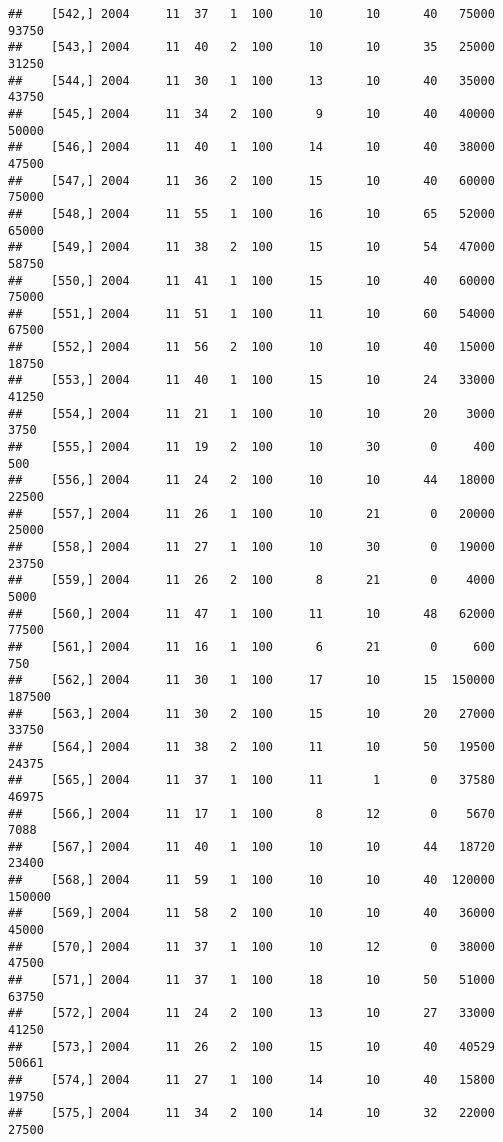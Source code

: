 \documentclass{article}\usepackage[]{graphicx}\usepackage[]{color}
\makeatletter
\newenvironment{kframe}{%
 \def\at@end@of@kframe{}%
 \ifinner\ifhmode%
  \def\at@end@of@kframe{\end{minipage}}%
  \begin{minipage}{\columnwidth}%
 \fi\fi%
 \def\FrameCommand##1{\hskip\@totalleftmargin \hskip-\fboxsep
 \colorbox{shadecolor}{##1}\hskip-\fboxsep
     \hskip-\linewidth \hskip-\@totalleftmargin \hskip\columnwidth}%
 \MakeFramed {\advance\hsize-\width
   \@totalleftmargin\z@ \linewidth\hsize
   \@setminipage}}%
 {\par\unskip\endMakeFramed%
 \at@end@of@kframe}
\newenvironment{knitrout}{}{} %
\makeatother
\begin{document}
\begin{knitrout}
\begin{kframe}
\begin{verbatim}
##    [542,] 2004     11  37   1  100     10      10      40   75000   93750
##    [543,] 2004     11  40   2  100     10      10      35   25000   31250
##    [544,] 2004     11  30   1  100     13      10      40   35000   43750
##    [545,] 2004     11  34   2  100      9      10      40   40000   50000
##    [546,] 2004     11  40   1  100     14      10      40   38000   47500
##    [547,] 2004     11  36   2  100     15      10      40   60000   75000
##    [548,] 2004     11  55   1  100     16      10      65   52000   65000
##    [549,] 2004     11  38   2  100     15      10      54   47000   58750
##    [550,] 2004     11  41   1  100     15      10      40   60000   75000
##    [551,] 2004     11  51   1  100     11      10      60   54000   67500
##    [552,] 2004     11  56   2  100     10      10      40   15000   18750
##    [553,] 2004     11  40   1  100     15      10      24   33000   41250
##    [554,] 2004     11  21   1  100     10      10      20    3000    3750
##    [555,] 2004     11  19   2  100     10      30       0     400     500
##    [556,] 2004     11  24   2  100     10      10      44   18000   22500
##    [557,] 2004     11  26   1  100     10      21       0   20000   25000
##    [558,] 2004     11  27   1  100     10      30       0   19000   23750
##    [559,] 2004     11  26   2  100      8      21       0    4000    5000
##    [560,] 2004     11  47   1  100     11      10      48   62000   77500
##    [561,] 2004     11  16   1  100      6      21       0     600     750
##    [562,] 2004     11  30   1  100     17      10      15  150000  187500
##    [563,] 2004     11  30   2  100     15      10      20   27000   33750
##    [564,] 2004     11  38   2  100     11      10      50   19500   24375
##    [565,] 2004     11  37   1  100     11       1       0   37580   46975
##    [566,] 2004     11  17   1  100      8      12       0    5670    7088
##    [567,] 2004     11  40   1  100     10      10      44   18720   23400
##    [568,] 2004     11  59   1  100     10      10      40  120000  150000
##    [569,] 2004     11  58   2  100     10      10      40   36000   45000
##    [570,] 2004     11  37   1  100     10      12       0   38000   47500
##    [571,] 2004     11  37   1  100     18      10      50   51000   63750
##    [572,] 2004     11  24   2  100     13      10      27   33000   41250
##    [573,] 2004     11  26   2  100     15      10      40   40529   50661
##    [574,] 2004     11  27   1  100     14      10      40   15800   19750
##    [575,] 2004     11  34   2  100     14      10      32   22000   27500

\end{verbatim}
\end{kframe}
\end{knitrout}
\end{document}
